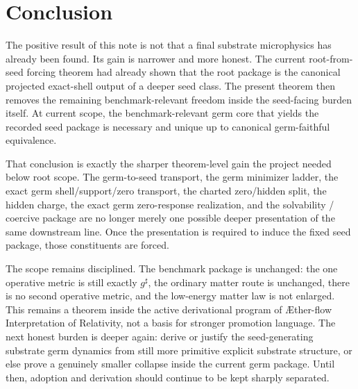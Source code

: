 \documentclass[11pt]{article}
\newcommand{\Aflow}{\AE{}ther-flow}
\newcommand{\TheoryName}{\Aflow{} Interpretation of Relativity}
\newcommand{\CompletedMetric}{g^{\sharp}}
\begin{document}
\section{Conclusion}

The positive result of this note is not that a final substrate microphysics has already been found. Its gain is narrower and more honest. The current root-from-seed forcing theorem had already shown that the root package is the canonical projected exact-shell output of a deeper seed class. The present theorem then removes the remaining benchmark-relevant freedom inside the seed-facing burden itself. At current scope, the benchmark-relevant germ core that yields the recorded seed package is necessary and unique up to canonical germ-faithful equivalence.

That conclusion is exactly the sharper theorem-level gain the project needed below root scope. The germ-to-seed transport, the germ minimizer ladder, the exact germ shell/support/zero transport, the charted zero/hidden split, the hidden charge, the exact germ zero-response realization, and the solvability / coercive package are no longer merely one possible deeper presentation of the same downstream line. Once the presentation is required to induce the fixed seed package, those constituents are forced.

The scope remains disciplined. The benchmark package is unchanged: the one operative metric is still exactly \(\CompletedMetric\), the ordinary matter route is unchanged, there is no second operative metric, and the low-energy matter law is not enlarged. This remains a theorem inside the active derivational program of \TheoryName{}, not a basis for stronger promotion language. The next honest burden is deeper again: derive or justify the seed-generating substrate germ dynamics from still more primitive explicit substrate structure, or else prove a genuinely smaller collapse inside the current germ package. Until then, adoption and derivation should continue to be kept sharply separated.
\end{document}
